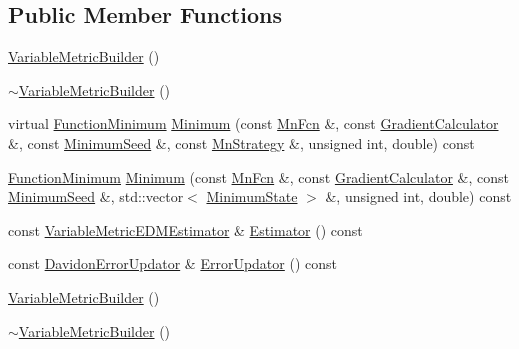 \subsection*{Public Member Functions}
\begin{DoxyCompactItemize}
\item 
\mbox{\hyperlink{classROOT_1_1Minuit2_1_1VariableMetricBuilder_a3fa1bd08281c31511236e97c865f893f}{Variable\+Metric\+Builder}} ()
\item 
\mbox{\hyperlink{classROOT_1_1Minuit2_1_1VariableMetricBuilder_ad3f542de61b199bb8305eb22713ad360}{$\sim$\+Variable\+Metric\+Builder}} ()
\item 
virtual \mbox{\hyperlink{classROOT_1_1Minuit2_1_1FunctionMinimum}{Function\+Minimum}} \mbox{\hyperlink{classROOT_1_1Minuit2_1_1VariableMetricBuilder_a56d18a37b8643611ff80875b91915784}{Minimum}} (const \mbox{\hyperlink{classROOT_1_1Minuit2_1_1MnFcn}{Mn\+Fcn}} \&, const \mbox{\hyperlink{classROOT_1_1Minuit2_1_1GradientCalculator}{Gradient\+Calculator}} \&, const \mbox{\hyperlink{classROOT_1_1Minuit2_1_1MinimumSeed}{Minimum\+Seed}} \&, const \mbox{\hyperlink{classROOT_1_1Minuit2_1_1MnStrategy}{Mn\+Strategy}} \&, unsigned int, double) const
\item 
\mbox{\hyperlink{classROOT_1_1Minuit2_1_1FunctionMinimum}{Function\+Minimum}} \mbox{\hyperlink{classROOT_1_1Minuit2_1_1VariableMetricBuilder_a6214271e1802f110e94725295f3900fc}{Minimum}} (const \mbox{\hyperlink{classROOT_1_1Minuit2_1_1MnFcn}{Mn\+Fcn}} \&, const \mbox{\hyperlink{classROOT_1_1Minuit2_1_1GradientCalculator}{Gradient\+Calculator}} \&, const \mbox{\hyperlink{classROOT_1_1Minuit2_1_1MinimumSeed}{Minimum\+Seed}} \&, std\+::vector$<$ \mbox{\hyperlink{classROOT_1_1Minuit2_1_1MinimumState}{Minimum\+State}} $>$ \&, unsigned int, double) const
\item 
const \mbox{\hyperlink{classROOT_1_1Minuit2_1_1VariableMetricEDMEstimator}{Variable\+Metric\+E\+D\+M\+Estimator}} \& \mbox{\hyperlink{classROOT_1_1Minuit2_1_1VariableMetricBuilder_a2440f7838cbff6043ee58272890aa210}{Estimator}} () const
\item 
const \mbox{\hyperlink{classROOT_1_1Minuit2_1_1DavidonErrorUpdator}{Davidon\+Error\+Updator}} \& \mbox{\hyperlink{classROOT_1_1Minuit2_1_1VariableMetricBuilder_aa10879d53daedb3e742f35d3c3f3b3d6}{Error\+Updator}} () const
\item 
\mbox{\hyperlink{classROOT_1_1Minuit2_1_1VariableMetricBuilder_a3fa1bd08281c31511236e97c865f893f}{Variable\+Metric\+Builder}} ()
\item 
\mbox{\hyperlink{classROOT_1_1Minuit2_1_1VariableMetricBuilder_ad3f542de61b199bb8305eb22713ad360}{$\sim$\+Variable\+Metric\+Builder}} ()

\end{DoxyCompactItemize}

